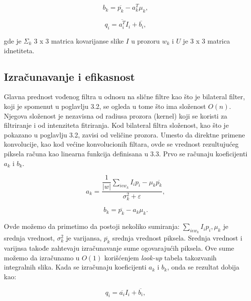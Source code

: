 \documentclass[a4paper,12pt,titlepage]{article}
\begin{document}
\begin{equation}\label{eq:gf12}
	b_k = \overline{p_k} - a_k^T \mu_k,
\end{equation}

\begin{equation}\label{eq:gf13}
	q_i = \overline{a_i^T} I_i + \overline{b_i},
\end{equation}

gde je $\Sigma_k$ 3 x 3 matrica kovarijanse slike $I$ u prozoru $w_k$ i $U$ je 3 x 3 matrica idnetiteta.

\subsection{Izračunavanje i efikasnost}%

Glavna prednost vođenog filtra u odnosu na slične filtre kao što je bilateral filter, koji je spomenut u poglavlju 3.2, se ogleda u tome što ima složenost $O(n)$. Njegova složenost je nezavisna od radiusa prozora (kernel) koji se koristi za filtriranje i od intenziteta fitriranja. Kod bilateral filtra složenost, kao što je pokazano u poglavlju 3.2, zavisi od veličine prozora. Umesto da direktne primene konvolucije, kao kod većine konvolucionih filtara, ovde se vrednost rezultujućeg piksela računa kao linearna funkcija definisana u 3.3. Prvo se računaju koeficijenti $a_k$ i $b_k$.

\begin{equation}\label{eq:gf14}
	a_k = \dfrac{\dfrac{1}{|w|} \sum_{i \epsilon w_k} I_ip_i - \mu_k \overline{p_k}}{\sigma_k^2 + \varepsilon},
\end{equation}

\begin{equation}\label{eq:gf15}
	b_k = \overline{p_k} - a_k \mu_k.
\end{equation}

Ovde možemo da primetimo da postoji nekoliko sumiranja:  $\sum_{i \epsilon w_k} I_ip_i, \mu_k$ je srednja vrednost, $\sigma_k^2$ je varijansa, $\overline{p_k}$ srednja vrednost piksela. Srednja vrednost i varijnsa takođe zahtevaju izračunavanje sume ogovarajućih piksela. Ove sume možemo da izračunamo u $O(1)$ korišćenjem \emph{look-up} tabela takozvanih integralnih slika. Kada se izračunaju koeficijenti $a_k$ i $b_k$, onda se rezultat dobija kao:

\begin{equation}\label{eq:gf16}
	q_i = \overline{a_i}I_i + \overline{b_i},
\end{equation}
\end{document}
